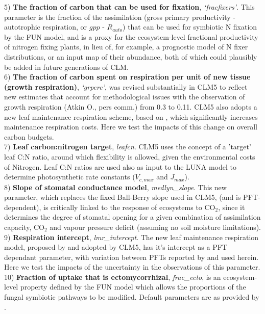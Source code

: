 \documentclass[draft,linenumbers]{agujournal}
\begin{document}
5) \textbf{The fraction of carbon that can be used for fixation}, \emph{`fracfixers'}. This parameter is the fraction of the assimilation (gross primary productivity - autotrophic respiration, or $gpp$ - $R_{auto}$) that can be used for symbiotic N fixation by the FUN model, and is a proxy for the ecosystem-level fractional productivity of nitrogen fixing plants, in lieu of, for example, a prognostic model of N fixer distributions, or an input map of their abundance, both of which could plausibly be added in future generations of CLM. \\

6) \textbf{The fraction of carbon spent on respiration per unit of new tissue (growth respiration)}, \emph{`grperc'}, was revised substantially in CLM5 to reflect new estimates that account for methodological issues with the observation of growth respiration (Atkin O., pers comm.) from 0.3 to 0.11. CLM5 also adopts a new leaf maintenance respiration scheme, based on \cite{atkin2015}, which significantly increases maintenance respiration costs. Here we test the impacts of this change on overall carbon budgets.\\

7) \textbf{Leaf carbon:nitrogen target}, \emph{leafcn}. CLM5 uses the concept of a 'target' leaf C:N ratio, around which flexibility is allowed, given the environmental costs of Nitrogen. Leaf C:N ratios are used also as input to the LUNA model to determine photosynthetic rate constants ($V_{c,max}$ and $J_{max}$). \\

8) \textbf{Slope of stomatal conductance model}, \emph{medlyn\_slope}. This new parameter, which replaces the fixed Ball-Berry slope used in CLM5, (and is PFT-dependent), is critically linked to the response of ecosystems to CO$_{2}$, since it determines the degree of stomatal opening for a given combination of assimilation capacity, CO$_{2}$ and vapour pressure deficit (assuming no soil moisture limitations).\\

9) \textbf{Respiration intercept}, \emph{lmr\_intercept}. The new leaf maintenance respiration model, proposed by \cite{atkin2015} and adopted by CLM5, has it's intercept as a PFT dependant parameter, with variation between PFTs reported by \cite{atkin2015} and used herein. Here we test the impacts of the uncertainty in the observations of this parameter. \\

10) \textbf{Fraction of uptake that is ectomycorrhizal}, \emph{frac\_ecto}, is an ecosystem-level property defined by the FUN model which allows the proportions of the fungal symbiotic pathways to be modified. Default parameters are as provided by \cite{shi2016}.\\
\end{document}
